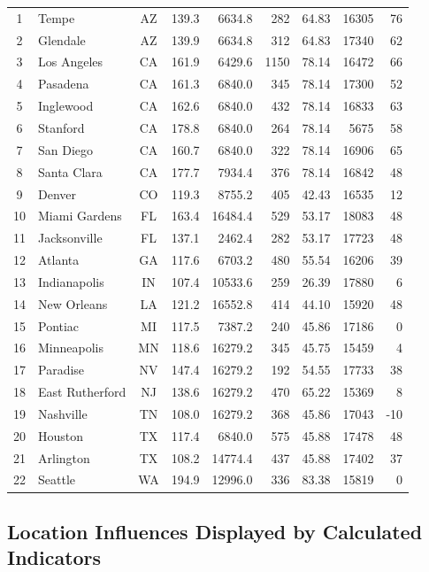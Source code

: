 \documentclass{mcmthesis}
\begin{document}
\begin{center}
\begin{longtable}{cl>{\ttfamily}crrrrrr}
1 & Tempe & AZ & 139.3 & 6634.8 & 282 & 64.83 & 16305 & 76 \\
2 & Glendale & AZ & 139.9 & 6634.8 & 312 & 64.83 & 17340 & 62 \\
3 & Los Angeles & CA & 161.9 & 6429.6 & 1150 & 78.14 & 16472 & 66 \\
4 & Pasadena & CA & 161.3 & 6840.0 & 345 & 78.14 & 17300 & 52 \\
5 & Inglewood & CA & 162.6 & 6840.0 & 432 & 78.14 & 16833 & 63 \\
6 & Stanford & CA & 178.8 & 6840.0 & 264 & 78.14 & 5675 & 58 \\
7 & San Diego & CA & 160.7 & 6840.0 & 322 & 78.14 & 16906 & 65 \\
8 & Santa Clara & CA & 177.7 & 7934.4 & 376 & 78.14 & 16842 & 48 \\
9 & Denver & CO & 119.3 & 8755.2 & 405 & 42.43 & 16535 & 12 \\
10 & Miami Gardens & FL & 163.4 & 16484.4 & 529 & 53.17 & 18083 & 48 \\
11 & Jacksonville & FL & 137.1 & 2462.4 & 282 & 53.17 & 17723 & 48 \\
12 & Atlanta  & GA & 117.6 & 6703.2 & 480 & 55.54 & 16206 & 39 \\
13 & Indianapolis & IN & 107.4 & 10533.6 & 259 & 26.39 & 17880 & 6 \\
14 & New Orleans & LA & 121.2 & 16552.8 & 414 & 44.10 & 15920 & 48 \\
15 & Pontiac & MI & 117.5 & 7387.2 & 240 & 45.86 & 17186 & 0 \\
16 & Minneapolis & MN & 118.6 & 16279.2 & 345 & 45.75 & 15459 & 4 \\
17 & Paradise & NV & 147.4 & 16279.2 & 192 & 54.55 & 17733 & 38 \\
18 & East Rutherford & NJ & 138.6 & 16279.2 & 470 & 65.22 & 15369 & 8 \\
19 & Nashville & TN & 108.0 & 16279.2 & 368 & 45.86 & 17043 & -10 \\
20 & Houston & TX & 117.4 & 6840.0 & 575 & 45.88 & 17478 & 48 \\
21 & Arlington & TX & 108.2 & 14774.4 & 437 & 45.88 & 17402 & 37 \\
22 & Seattle & WA & 194.9 & 12996.0 & 336 & 83.38 & 15819 & 0 \\


\end{longtable}
\end{center}


\subsection{Location Influences Displayed by Calculated Indicators} \label{subsec:indicator_insights}
\end{document}
